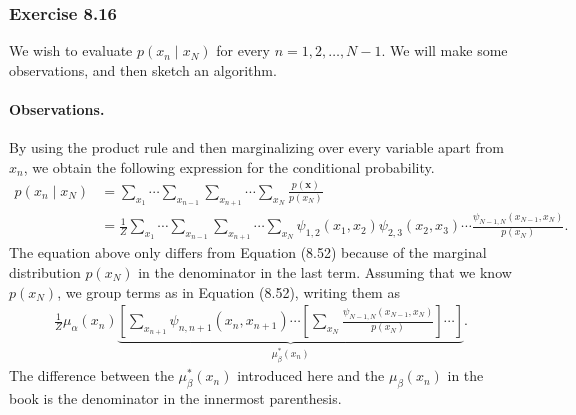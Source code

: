 \documentclass[12pt, a4paper]{article}
\newcommand{\vect}[1]{\bm{#1}}
\begin{document}
\subsubsection*{Exercise 8.16}
We wish to evaluate $p(x_n \mid x_{N})$ for every $n=1, 2, \ldots, N-1$.
We will make some observations, and then sketch an algorithm.

\paragraph{Observations.}
By using the product rule and then marginalizing over every variable apart from $x_n$, we obtain the following expression for the conditional probability.
\begin{align*}
	p(x_n \mid x_{N}) &=
	\sum_{x_1} \cdots \sum_{x_{n-1}} \sum_{x_{n+1}} \cdots \sum_{x_{N}}
	\frac{p(\vect{x})}{p(x_{N})} \\
	&=
	\frac{1}{Z}\sum_{x_1} \cdots \sum_{x_{n-1}} \sum_{x_{n+1}} \cdots \sum_{x_{N}}
	\psi_{1,2}(x_1, x_2)
	\psi_{2,3}(x_2, x_3)
	 \cdots \frac{\psi_{N-1,N}(x_{N-1}, x_N)}{p(x_{N})}.
\end{align*}
The equation above only differs from Equation (8.52) because of the marginal distribution $p(x_{N})$ in the denominator in the last term.
Assuming that we know $p(x_{N})$, we group terms as in Equation (8.52), writing them as
\begin{align*}
	\frac{1}{Z} \mu_\alpha(x_n)
	\underbrace{\left[ \sum_{x_{n+1}} \psi_{n,n+1}(x_{n}, x_{n+1})
	\cdots
	\left[ \sum_{x_{N}} \frac{\psi_{N-1,N}(x_{N-1}, x_N)}{p(x_{N})}  \right]
	 \cdots \right]}_{\mu_\beta^*(x_n)}.
\end{align*}
The difference between the $\mu_\beta^*(x_n)$ introduced here and the $\mu_\beta(x_n)$ in the book is the denominator in the innermost parenthesis.
\end{document}
